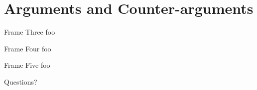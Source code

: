 \documentclass[aspectratio=1610]{beamer}
\begin{document}
\section{Arguments and Counter-arguments}


\begin{frame}{Frame Three}
	foo
\end{frame}


\begin{frame}{Frame Four}
	foo
\end{frame}


\begin{frame}{Frame Five}
	foo
\end{frame}


\begin{frame}[standout]
	Questions?
\end{frame}
\end{document}
